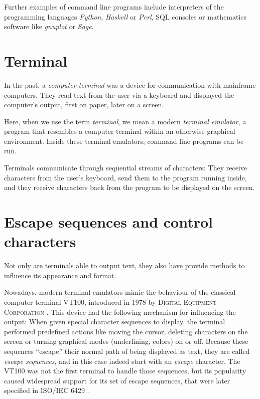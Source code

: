 \documentclass[paper=a4,twoside,abstract=on,cleardoublepage=empty,numbers=noenddot,toc=bib,toc=listof,12pt,appendixprefix=true]{scrreprt}
\begin{document}
Further examples of command line programs include interpreters of the programming languages \emph{Python}, \emph{Haskell} or \emph{Perl}, SQL consoles or mathematics software like \emph{gnuplot} or \emph{Sage}.

\section{Terminal}

In the past, a \emph{computer terminal} was a device for communication with mainframe computers. They read text from the user via a keyboard and displayed the computer's output, first on paper, later on a screen.

Here, when we use the term \emph{terminal}, we mean a modern \emph{terminal emulator}, a program that resembles a computer terminal within an otherwise graphical environment. Inside these terminal emulators, command line programs can be run.

Terminals communicate through sequential streams of characters: They receive characters from the user's keyboard, send them to the program running inside, and they receive characters back from the program to be displayed on the screen.

\section{Escape sequences and control characters}

Not only are terminals able to output text, they also have provide methods to influence its appearance and format.

Nowadays, modern terminal emulators mimic the behaviour of the classical computer terminal \textsc{VT100}, introduced in 1978 by \textsc{Digital Equipment Corporation} \cite{upt02}. This device had the following mechanism for influencing the output: When given special character sequences to display, the terminal performed predefined actions like moving the cursor, deleting characters on the screen or turning graphical modes (underlining, colors) on or off. Because these sequences “escape” their normal path of being displayed as text, they are called \emph{escape sequences}, and in this case indeed start with an \emph{escape} character. The \textsc{VT100} was not the first terminal to handle those sequences, but its popularity caused widespread support for its set of escape sequences, that were later specified in \textsc{ISO}/\textsc{IEC} 6429 \cite{iso6429}.
\end{document}
